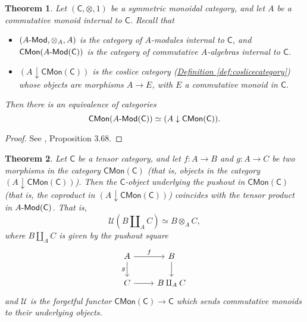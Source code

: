 \documentclass[a4paper]{report}
\def\mhyp{{\hbox{-}}}
\theoremstyle{definition}
\theoremstyle{plain}
\newtheorem{theorem}{Theorem}[section]
\theoremstyle{remark}
\begin{document}
\begin{theorem}
  \label{thm:modulesandmonoidsequivalenceofcategories}
  Let $(\mathsf{C}, \otimes, 1)$ be a symmetric monoidal category, and let $A$ be a commutative monoid internal to $\mathsf{C}$. Recall that
  \begin{itemize}
    \item $(A\mhyp\mathsf{Mod}, \otimes_{A}, A)$ is the category of $A$-modules internal to $\mathsf{C}$, and $\mathsf{CMon}(A\mhyp\mathsf{Mod}(\mathsf{C}))$ is the category of commutative $A$-algebras internal to $\mathsf{C}$.

    \item $(A \downarrow\mathsf{CMon}(\mathsf{C}))$ is the coslice category (\hyperref[def:coslicecategory]{Definition \ref*{def:coslicecategory}}) whose objects are morphisms $A \to E$, with $E$ a commutative monoid in $\mathsf{C}$.
  \end{itemize}

  Then there is an equivalence of categories
  \begin{equation*}
    \mathsf{CMon}(A\mhyp\mathsf{Mod}(\mathsf{C})) \simeq (A \downarrow\mathsf{CMon}(\mathsf{C})).
  \end{equation*}
\end{theorem}
\begin{proof}
  See \cite{nlab-deligne-theorem}, Proposition 3.68.
\end{proof}

\begin{theorem}
  \label{thm:tensorproductofcommutativemonoidsispushout}
  Let $\mathsf{C}$ be a tensor category, and let $f\colon A \to B$ and $g\colon A \to C$ be two morphisms in the category $\mathsf{CMon}(\mathsf{C})$ (that is, objects in the category $(A \downarrow\mathsf{CMon}(\mathsf{C}))$). Then the $\mathsf{C}$-object underlying the pushout in $\mathsf{CMon}(\mathsf{C})$ (that is, the coproduct in $(A \downarrow\mathsf{CMon}(\mathsf{C}))$) coincides with the tensor product in $A\mhyp\mathsf{Mod}(\mathsf{C})$. That is, 
  \begin{equation*}
    \mathcal{U}\left( B \amalg_{A} C \right) \simeq B \otimes_{A} C,
  \end{equation*}
  where $B \amalg_{A} C$ is given by the pushout square 
  \begin{equation*}
    \begin{tikzcd}
      A 
      \arrow[r, "f"]
      \arrow[d, swap, "g"]
      & B
      \arrow[d]
      \\
      C
      \arrow[r]
      & B \amalg_{A} C
    \end{tikzcd}
  \end{equation*}
  and $\mathcal{U}$ is the forgetful functor $\mathsf{CMon}(\mathsf{C}) \to \mathsf{C}$ which sends commutative monoids to their underlying objects.
\end{theorem}
\end{document}

